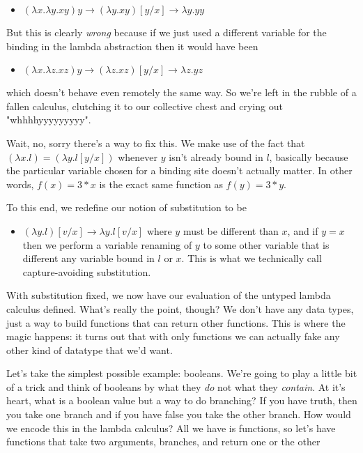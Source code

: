 \documentclass[11pt]{article}
\begin{document}
\begin{itemize}
\item $(\lambda x. \lambda y. x y) y \to (\lambda y. x y)[y/x] \to \lambda y. y y$
\end{itemize}

But this is clearly \emph{wrong} because if we just used a different variable for the binding in the lambda abstraction then it would have been

\begin{itemize}
\item $(\lambda x. \lambda z. x z) y \to (\lambda z. x z)[y/x] \to \lambda z. y z$
\end{itemize}

which doesn't behave even remotely the same way. So we're left in the rubble of a fallen calculus, clutching it to our collective chest and crying out "whhhhyyyyyyyyy".

Wait, no, sorry there's a way to fix this. We make use of the fact that $(\lambda x. l) = (\lambda y. l[y/x])$ whenever $y$ isn't already bound in $l$, basically because the particular variable chosen for a binding site doesn't actually matter. In other words, $f(x) = 3*x$ is the exact same function as $f(y) = 3*y$.

To this end, we redefine our notion of substitution to be
\begin{itemize}
\item $(\lambda y. l)[v/x] \to \lambda y. l[v/x]$ where $y$ must be different than $x$, and if $y=x$ then we perform a variable renaming of $y$ to some other variable that is different any variable bound in $l$ or $x$. This is what we technically call capture-avoiding substitution.
\end{itemize}

With substitution fixed, we now have our evaluation of the untyped lambda calculus defined. What's really the point, though? We don't have any data types, just a way to build functions that can return other functions. This is where the magic happens: it turns out that with only functions we can actually fake any other kind of datatype that we'd want.

Let's take the simplest possible example: booleans. We're going to play a little bit of a trick and think of booleans by what they \emph{do} not what they \emph{contain}. At it's heart, what is a boolean value but a way to do branching? If you have truth, then you take one branch and if you have false you take the other branch. How would we encode this in the lambda calculus? All we have is functions, so let's have functions that take two arguments, branches, and return one or the other
\end{document}
